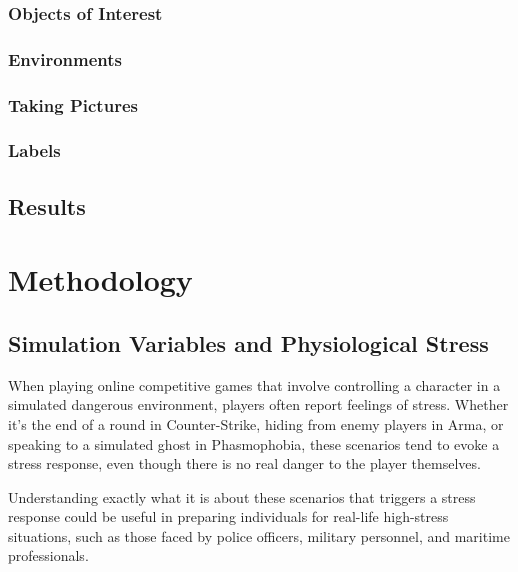 \documentclass[12pt]{article}
\begin{document}
\subsubsection{Objects of Interest}

\subsubsection{Environments}

\subsubsection{Taking Pictures}


\subsubsection{Labels}

\subsection{Results}

\section{Methodology}

\subsection{Simulation Variables and Physiological Stress}

When playing online competitive games that involve controlling a character in a simulated dangerous environment, players often report feelings of stress. Whether it's the end of a round in Counter-Strike, hiding from enemy players in Arma, or speaking to a simulated ghost in Phasmophobia, these scenarios tend to evoke a stress response, even though there is no real danger to the player themselves.

Understanding exactly what it is about these scenarios that triggers a stress response could be useful in preparing individuals for real-life high-stress situations, such as those faced by police officers, military personnel, and maritime professionals.
\end{document}

